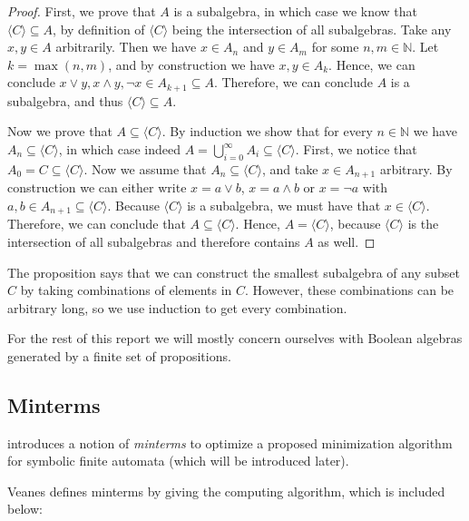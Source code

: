 \begin{proof}
First, we prove that $A$ is a subalgebra, in which case we know that $\langle C \rangle \subseteq A$, by definition of $\langle C \rangle$ being the intersection of all subalgebras. Take any $x, y \in A$ arbitrarily. Then we have $x \in A_n$ and $y \in A_m$ for some $n, m \in \mathbb{N}$. Let $k = \max(n, m)$, and by construction we have $x, y \in A_k$. Hence, we can conclude $x \lor y, x \land y, \neg x \in A_{k+1} \subseteq A$. Therefore, we can conclude $A$ is a subalgebra, and thus $\langle C \rangle \subseteq A$.

Now we prove that $A \subseteq \langle C \rangle$. By induction we show that for every $n \in \mathbb{N}$ we have $A_n \subseteq \langle C \rangle$, in which case indeed $A = \bigcup_{i=0}^\infty A_i \subseteq \langle C \rangle$. First, we notice that $A_0 = C \subseteq \langle C \rangle$. Now we assume that $A_n \subseteq \langle C \rangle$, and take $x \in A_{n+1}$ arbitrary. By construction we can either write $x = a \lor b$, $x = a \land b$ or $x = \neg a$ with $a, b \in A_{n+1} \subseteq \langle C \rangle$. Because $\langle C \rangle$ is a subalgebra, we must have that $x \in \langle C \rangle$. Therefore, we can conclude that $A \subseteq \langle C \rangle$. Hence, $A = \langle C \rangle$, because $\langle C \rangle$ is the intersection of all subalgebras and therefore contains $A$ as well.
\end{proof}

The proposition says that we can construct the smallest subalgebra of any subset $C$ by taking combinations of elements in $C$. However, these combinations can be arbitrary long, so we use induction to get every combination. 

For the rest of this report we will mostly concern ourselves with Boolean algebras generated by a finite set of propositions.

\subsection{Minterms}

\citep{veanes} introduces a notion of \emph{minterms} to optimize a proposed minimization algorithm for symbolic finite automata (which will be introduced later).

Veanes defines minterms by giving the computing algorithm, which is included below:

